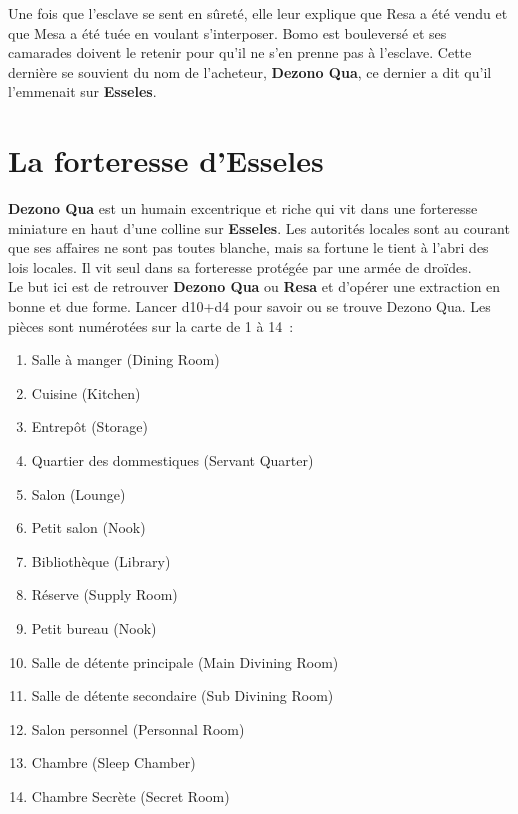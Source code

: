 \documentclass{jdrp}
\begin{document}
	Une fois que l’esclave se sent en sûreté, elle leur explique que Resa a été vendu et que Mesa a été tuée en voulant s’interposer. Bomo est bouleversé et ses camarades doivent le retenir pour qu’il ne s’en prenne pas à l’esclave. Cette dernière se souvient du nom de l’acheteur, \textbf{Dezono Qua}, ce dernier a dit qu’il l’emmenait sur \textbf{Esseles}.

	\section{La forteresse d’Esseles}
	\textbf{Dezono Qua} est un humain excentrique et riche qui vit dans une forteresse miniature en haut d’une colline sur \textbf{Esseles}. Les autorités locales sont au courant que ses affaires ne sont pas toutes blanche, mais sa fortune le tient à l’abri des lois locales. Il vit seul dans sa forteresse protégée par une armée de droïdes.\\ 

	Le but ici est de retrouver \textbf{Dezono Qua} ou \textbf{Resa} et d’opérer une extraction en bonne et due forme. Lancer d10+d4 pour savoir ou se trouve Dezono Qua. Les pièces sont numérotées sur la carte de 1 à 14~:
	\begin{enumerate}
		\item Salle à manger (Dining Room)
		\item Cuisine (Kitchen)
		\item Entrepôt (Storage)
		\item Quartier des dommestiques (Servant Quarter)
		\item Salon (Lounge)
		\item Petit salon (Nook)
		\item Bibliothèque (Library)
		\item Réserve (Supply Room)
		\item Petit bureau (Nook)
		\item Salle de détente principale (Main Divining Room)
		\item Salle de détente secondaire (Sub Divining Room)
		\item Salon personnel (Personnal Room)
		\item Chambre (Sleep Chamber)
		\item Chambre Secrète (Secret Room)
	\end{enumerate}
	\onecolumn
\end{document}
